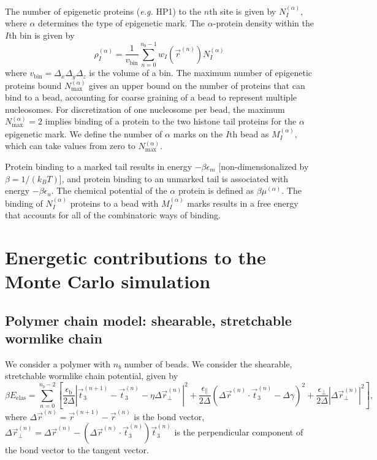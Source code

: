 \documentclass{simulation}
\begin{document}
The number of epigenetic proteins (\emph{e.g.} HP1) to the $n$th site is given by $N_{I}^{(\alpha)}$, where $\alpha$ determines
the type of epigenetic mark.
The $\alpha$-protein density within the $I$th bin is given by
\begin{equation}
\rho_{I}^{(\alpha)} = \frac{1}{v_{\mathrm{bin}}} \sum_{n=0}^{n_{b} - 1} w_{I}(\vec{r}^{(n)}) N_{I}^{(\alpha)}
\end{equation}
\noindent
where $v_{\mathrm{bin}} = \Delta_{x} \Delta_{y} \Delta_{z}$ is the volume of a bin.
The maximum number of epigenetic proteins bound $N_{\mathrm{max}}^{(\alpha)}$ gives an upper bound on the
number of proteins that can bind to a bead, accounting for coarse graining of a bead to represent multiple nucleosomes.
For discretization of one nucleosome per bead, the maximum $N_{\mathrm{max}}^{(\alpha)} = 2$ implies binding 
of a protein to the two histone tail proteins for the $\alpha$ epigenetic mark.
We define the number of $\alpha$ marks on the $I$th bead as $M_{I}^{(\alpha)}$, which can take values from zero
to $N_{\mathrm{max}}^{(\alpha)}$.

Protein binding to a marked tail results in energy $-\beta \epsilon_{m}$ [non-dimensionalized by $\beta = 1/(k_{B}T)$], and protein binding to an unmarked tail is associated with
energy $-\beta \epsilon_{u}$.  The chemical potential of the $\alpha$ protein is defined as $\beta \mu^{(\alpha)}$.
The binding of $N_{I}^{(\alpha)}$ proteins to a bead with $M_{I}^{(\alpha)}$ marks results in a free energy that 
accounts for all of the combinatoric ways of binding.

\section{Energetic contributions to the Monte Carlo simulation}

\subsection{Polymer chain model: shearable, stretchable wormlike chain}
We consider a polymer with $n_{b}$ number of beads.
We consider the shearable, stretchable wormlike chain potential, given by
\begin{equation}
\beta E_{\mathrm{elas}} = \sum_{n=0}^{n_{b}-2}
\left[
\frac{\epsilon_{\mathrm{b}}}{2 \Delta} \left| \vec{t}_{3}^{(n+1)} - \vec{t}_{3}^{(n)} - \eta \Delta \vec{r}_{\perp}^{(n)} \right|^{2} +
\frac{\epsilon_{\mathrm{\parallel}}}{2 \Delta} \left( \Delta \vec{r}^{(n)} \cdot \vec{t}_{3}^{(n)} - \Delta \gamma \right)^{2} +
\frac{\epsilon_{\mathrm{\perp}}}{2 \Delta} \left| \Delta \vec{r}_{\perp}^{(n)} \right|^{2}
\right],
\end{equation}
\noindent
where $\Delta \vec{r}^{(n)} = \vec{r}^{(n+1)} - \vec{r}^{(n)}$ is the bond vector,   
$\Delta \vec{r}_{\perp}^{(n)} = \Delta \vec{r}^{(n)} - (\Delta \vec{r}^{(n)} \cdot \vec{t}_{3}^{(n)}) \vec{t}_{3}^{(n)}$ is the
perpendicular component of the bond vector to the tangent vector. 





\end{document}
